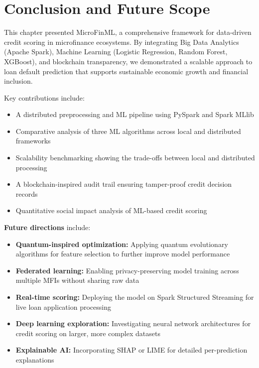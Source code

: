 \documentclass[preprint,12pt,authoryear]{elsarticle}
\begin{document}
\section{Conclusion and Future Scope}
\label{sec:conclusion}

This chapter presented MicroFinML, a comprehensive framework for data-driven credit scoring in microfinance ecosystems. By integrating Big Data Analytics (Apache Spark), Machine Learning (Logistic Regression, Random Forest, XGBoost), and blockchain transparency, we demonstrated a scalable approach to loan default prediction that supports sustainable economic growth and financial inclusion.

Key contributions include:
\begin{itemize}
    \item A distributed preprocessing and ML pipeline using PySpark and Spark MLlib
    \item Comparative analysis of three ML algorithms across local and distributed frameworks
    \item Scalability benchmarking showing the trade-offs between local and distributed processing
    \item A blockchain-inspired audit trail ensuring tamper-proof credit decision records
    \item Quantitative social impact analysis of ML-based credit scoring
\end{itemize}

\textbf{Future directions} include:
\begin{itemize}
    \item \textbf{Quantum-inspired optimization:} Applying quantum evolutionary algorithms for feature selection to further improve model performance~\cite{li2020quantum, orus2019quantum}
    \item \textbf{Federated learning:} Enabling privacy-preserving model training across multiple MFIs without sharing raw data~\cite{yang2019federated}
    \item \textbf{Real-time scoring:} Deploying the model on Spark Structured Streaming for live loan application processing
    \item \textbf{Deep learning exploration:} Investigating neural network architectures for credit scoring on larger, more complex datasets~\cite{bussmann2021deep}
    \item \textbf{Explainable AI:} Incorporating SHAP or LIME for detailed per-prediction explanations~\cite{bucker2022xai}
\end{itemize}
\end{document}
